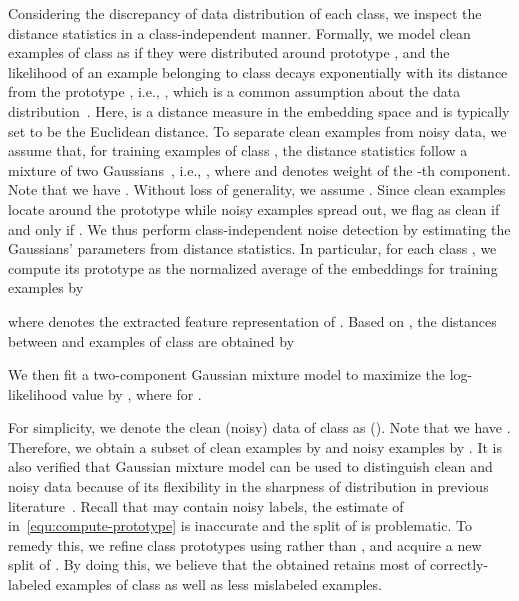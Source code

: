 \documentclass{article}
\begin{document}
Considering the discrepancy of data distribution of each class, we inspect the distance statistics in a class-independent manner. Formally, we model clean examples of class  as if they were distributed around prototype , and the likelihood of an example  belonging to class  decays exponentially with its distance from the prototype , i.e., , which is a common assumption about the data distribution~\cite{DBLP:conf/nips/GoldbergerRHS04,DBLP:journals/corr/abs-2104-03066}. Here,  is a distance measure in the embedding space and is typically set to be the Euclidean distance. 
To separate clean examples from noisy data, we assume that, for training examples of class , the distance statistics follow a mixture of two Gaussians~\cite{DBLP:journals/pr/PermuterFJ06}, i.e., , where  and  denotes weight of the -th component. Note that we have . Without loss of generality, we assume . Since clean examples locate around the prototype while noisy examples spread out, we flag  as clean if and only if .
We thus perform class-independent noise detection by estimating the Gaussians' parameters from distance statistics.
In particular, for each class , we compute its prototype as the normalized average of the embeddings for training examples by

where  denotes the extracted feature representation of . Based on , the distances between  and examples of class  are obtained by

We then fit a two-component Gaussian mixture model to maximize the log-likelihood value by , where  for .

For simplicity, we denote the clean (noisy) data of class  as  (). Note that we have . Therefore, we obtain a subset of clean examples by  and noisy examples by . 
It is also verified that Gaussian mixture model can be used to distinguish clean and noisy data because of its flexibility in the sharpness of distribution in previous literature~\cite{li2020dividemix}.
Recall that  may contain noisy labels, the estimate of  in~\eqref{equ:compute-prototype} is inaccurate and the split of  is problematic. To remedy this, we refine class prototypes using  rather than , and acquire a new split of . By doing this, we believe that the obtained  retains most of correctly-labeled examples of class  as well as less mislabeled examples. 
\end{document}
